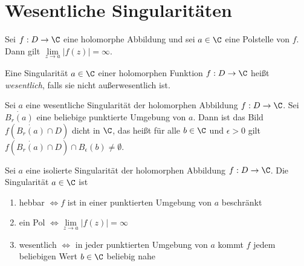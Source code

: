 \section{Wesentliche Singularitäten}\lecture
		
		\begin{prop}
			Sei $ f: D \to \C $ eine holomorphe Abbildung und sei $ a \in \C $ eine Polstelle von $f$. Dann gilt $ \lim\limits_{z\to a} |f(z)| = \infty. $
		\end{prop}
		
		\begin{defn}
			Eine Singularität $a \in \C$ einer holomorphen Funktion $f: D \to \C$ heißt \emph{wesentlich}, falls sie nicht außerwesentlich ist.
		\end{defn}
		
		\begin{thmn}
			Sei $a$ eine wesentliche Singularität der holomorphen Abbildung $f: D \to \C$. Sei $ \dot{B_r(a)} $ eine beliebige punktierte Umgebung von $a$. Dann ist das Bild $ f\left(\dot{B_r(a)} \cap D\right) $ dicht in $\C$, das heißt für alle $b \in \C$ und $\epsilon > 0$ gilt $ f\left( \dot{B_r(a)} \cap D\right) \cap B_\epsilon(b) \neq \emptyset. $
		\end{thmn}
		
		\begin{thmn}
			Sei $a$ eine isolierte Singularität der holomorphen Abbildung $f: D \to \C$. Die Singularität $a \in \C$ ist
			\begin{enumerate}[label={\roman*})]
				\item hebbar $\iff f$ ist in einer punktierten Umgebung von $a$ beschränkt
				\item ein Pol $\iff \lim\limits_{z\to a}|f(z)| = \infty$
				\item wesentlich $\iff$ in jeder punktierten Umgebung von $a$ kommt $f$ jedem beliebigen Wert $b \in \C$ beliebig nahe
			\end{enumerate}
		\end{thmn}